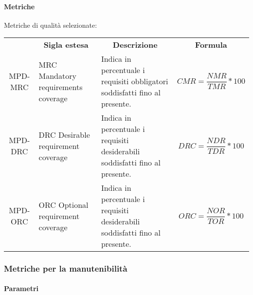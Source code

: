 \paragraph{Metriche}
Metriche di qualità selezionate:
\begin{table}[H]
    \centering
    \renewcommand{\arraystretch}{1.8}
    \begin{tabular}{| c | p{4.2cm} | p{5cm} | p{2cm} |  }
        \rowcolor[HTML]{a52a2a}
        \multicolumn{1}{c}{\color[HTML]{FFFFFF} \textbf{Codice}}       &
        \multicolumn{1}{c}{\color[HTML]{FFFFFF} \textbf{Sigla estesa}} &
        \multicolumn{1}{c}{\color[HTML]{FFFFFF} \textbf{Descrizione}}  &
        \multicolumn{1}{c}{\color[HTML]{FFFFFF} \textbf{Formula}}                                                                                                                                                                                     \\
        MPD-MRC                                                        & MRC Mandatory requirements coverage & Indica in percentuale i requisiti obbligatori soddisfatti fino al presente.  & \begin{equation} CMR=\frac{NMR}{TMR}*100 \end{equation} \\
        MPD-DRC                                                        & DRC Desirable requirement coverage  & Indica in percentuale i requisiti desiderabili soddisfatti fino al presente. & \begin{equation} DRC=\frac{NDR}{TDR}*100 \end{equation} \\
        MPD-ORC                                                        & ORC Optional requirement coverage   & Indica in percentuale i requisiti desiderabili soddisfatti fino al presente. & \begin{equation} ORC=\frac{NOR}{TOR}*100 \end{equation} \\
        \hline
    \end{tabular}
\end{table}

\subsubsection{Metriche per la manutenibilità}
\paragraph{Parametri}
